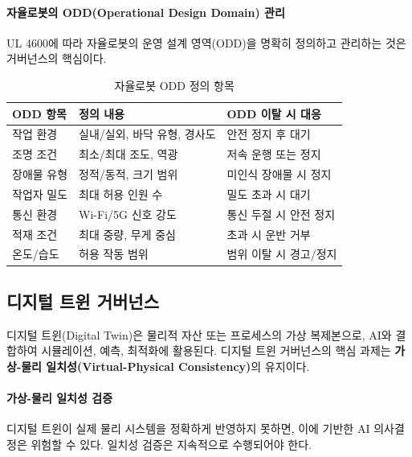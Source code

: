 \paragraph{자율로봇의 ODD(Operational Design Domain) 관리}

UL 4600에 따라 자율로봇의 운영 설계 영역(ODD)을 명확히 정의하고 관리하는 것은 거버넌스의 핵심이다.

\begin{table}[htbp]
\centering
\caption{자율로봇 ODD 정의 항목}
\label{tab:19_odd}
\begin{tabularx}{\textwidth}{p{3cm}Xp{4cm}}
\toprule
\textbf{ODD 항목} & \textbf{정의 내용} & \textbf{ODD 이탈 시 대응} \\
\midrule
작업 환경 & 실내/실외, 바닥 유형, 경사도 & 안전 정지 후 대기 \\
조명 조건 & 최소/최대 조도, 역광 & 저속 운행 또는 정지 \\
장애물 유형 & 정적/동적, 크기 범위 & 미인식 장애물 시 정지 \\
작업자 밀도 & 최대 허용 인원 수 & 밀도 초과 시 대기 \\
통신 환경 & Wi-Fi/5G 신호 강도 & 통신 두절 시 안전 정지 \\
적재 조건 & 최대 중량, 무게 중심 & 초과 시 운반 거부 \\
온도/습도 & 허용 작동 범위 & 범위 이탈 시 경고/정지 \\
\bottomrule
\end{tabularx}
\end{table}

\subsection{디지털 트윈 거버넌스}
\label{sec:19.3.3b}

디지털 트윈(Digital Twin)은 물리적 자산 또는 프로세스의 가상 복제본으로, AI와 결합하여 시뮬레이션, 예측, 최적화에 활용된다. 디지털 트윈 거버넌스의 핵심 과제는 \textbf{가상-물리 일치성(Virtual-Physical Consistency)}의 유지이다.

\paragraph{가상-물리 일치성 검증}

디지털 트윈이 실제 물리 시스템을 정확하게 반영하지 못하면, 이에 기반한 AI 의사결정은 위험할 수 있다. 일치성 검증은 지속적으로 수행되어야 한다.

